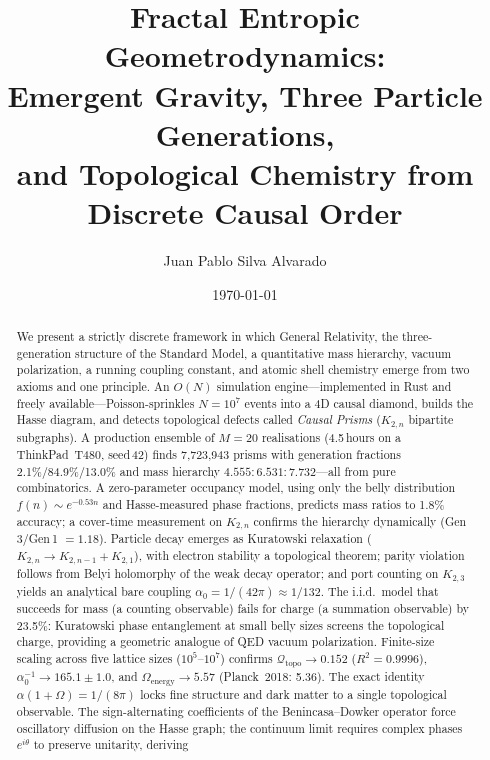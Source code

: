 \documentclass[aps,prd,twocolumn,superscriptaddress,nofootinbib,amsmath,amssymb,longbibliography]{revtex4-2}
\newcommand{\Kbn}{K_{2,n}}
\newcommand{\Qtopo}{\mathcal{Q}_{\mathrm{topo}}}
\begin{document}
\title{Fractal Entropic Geometrodynamics:\\
Emergent Gravity, Three Particle Generations,\\
and Topological Chemistry from Discrete Causal Order}

\author{Juan Pablo Silva Alvarado}

\date{\today}

\begin{abstract}
We present a strictly discrete framework in which General Relativity,
the three-generation structure of the Standard Model, a quantitative
mass hierarchy, vacuum polarization, a running coupling constant,
and atomic shell chemistry emerge from two axioms and one principle.
An $O(N)$ simulation engine---implemented in Rust and freely
available---Poisson-sprinkles $N = 10^7$ events into a 4D causal diamond,
builds the Hasse diagram, and detects topological defects called
\emph{Causal Prisms} ($\Kbn$ bipartite subgraphs).
A production ensemble of $M = 20$ realisations (4.5\,hours on a
ThinkPad~T480, seed\,42) finds 7{,}723{,}943 prisms with generation
fractions 2.1\%/84.9\%/13.0\% and mass hierarchy
$4.555 : 6.531 : 7.732$---all from pure combinatorics.
A zero-parameter occupancy model, using only the belly distribution
$f(n) \sim e^{-0.53n}$ and Hasse-measured phase fractions, predicts
mass ratios to 1.8\% accuracy; a cover-time measurement on $\Kbn$
confirms the hierarchy dynamically (Gen\,3/Gen\,1 $= 1.18$).
Particle decay emerges as Kuratowski relaxation
($K_{2,n} \to K_{2,n-1} + K_{2,1}$), with electron stability a
topological theorem; parity violation follows from Belyi holomorphy
of the weak decay operator; and port counting on $K_{2,3}$ yields an
analytical bare coupling $\alpha_0 = 1/(42\pi) \approx 1/132$.
The i.i.d.\ model that succeeds for mass (a counting observable)
fails for charge (a summation observable) by 23.5\%: Kuratowski
phase entanglement at small belly sizes screens the topological
charge, providing a geometric analogue of QED vacuum polarization.
Finite-size scaling across five lattice sizes ($10^5$--$10^7$)
confirms $\Qtopo \to 0.152$ ($R^2 = 0.9996$),
$\alpha_0^{-1} \to 165.1 \pm 1.0$, and
$\Omega_{\mathrm{energy}} \to 5.57$ (Planck~2018: 5.36).
The exact identity $\alpha(1 + \Omega) = 1/(8\pi)$ locks fine
structure and dark matter to a single topological observable.
The sign-alternating coefficients of the Benincasa--Dowker operator
force oscillatory diffusion on the Hasse graph; the continuum limit
requires complex phases $e^{i\theta}$ to preserve unitarity, deriving

\end{abstract}
\end{document}
